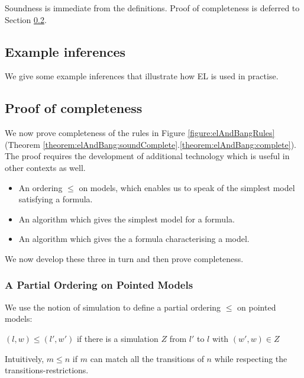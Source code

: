 \NI Soundness is immediate from the definitions. Proof of completeness is
deferred to Section \ref{completenessProof}. 

\subsection{Example inferences}

We give some example inferences that illustrate how EL is used in
practise.

\subsection{Proof of completeness}\label{completenessProof}

\NI We now prove completeness of the rules in Figure
\ref{figure:elAndBangRules} (Theorem
\ref{theorem:elAndBang:soundComplete}.\ref{theorem:elAndBang:complete}).
The proof requires the development of additional technology which is
useful in other contexts as well.

\begin{itemize}

\item An ordering $\leq$ on models, which enables us to speak of the
  simplest model satisfying a formula.

\item An algorithm which gives the simplest model for a formula.

\item An algorithm which gives the a formula characterising a model.

\end{itemize}

\NI We now develop these three in turn and then prove completeness.

\subsubsection{A Partial Ordering on Pointed Models}

\NI We use the notion of simulation to define a partial ordering
$\leq$ on pointed models: \martin

\begin{definition}
$(l,w) \leq (l',w')$ if there is a simulation $Z$ from $l'$ to $l$ with $(w',w) \in Z$
\end{definition}
Intuitively, $m \leq n$ if $m$ can match all the transitions of $n$ while respecting the transitions-restrictions.

